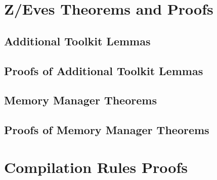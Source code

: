 \documentclass[a4paper,11pt]{report}
\begin{document}

\chapter{Z/Eves Theorems and Proofs}
\label{zeves-proofs}

\section{Additional Toolkit Lemmas}
\label{additional-lemmas}
\normalsize

 

\section{Proofs of Additional Toolkit Lemmas}
\label{additional-lemmas-proofs}
\scriptsize





\section{Memory Manager Theorems}
\label{memory-manager-theorems}
\normalsize



\section{Proofs of Memory Manager Theorems}
\label{memory-manager-proofs}
\scriptsize




\normalsize
\chapter{Compilation Rules Proofs}
\label{compilation-rules-proofs-appendix}

\end{document}

